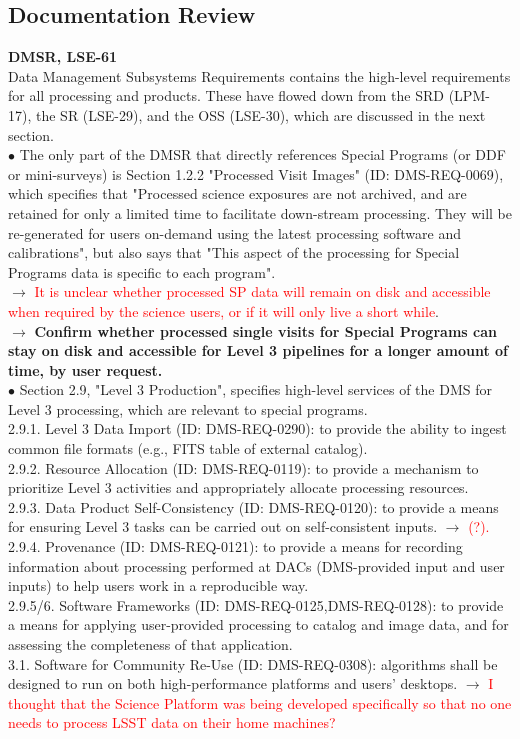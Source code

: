 \documentclass[DM,lsstdraft,toc]{lsstdoc}
\begin{document}
\subsection{Documentation Review}\label{ssec:dmdocs_review}

\noindent \textbf{DMSR, LSE-61} \\
Data Management Subsystems Requirements \citep{LSE-61} contains the high-level requirements for all processing and products. These have flowed down from the SRD (LPM-17), the SR (LSE-29), and the OSS (LSE-30), which are discussed in the next section. \\
$\bullet$ The only part of the DMSR that directly references Special Programs (or DDF or mini-surveys) is Section 1.2.2 "Processed Visit Images" (ID: DMS-REQ-0069), which specifies that "Processed science exposures are not archived, and are retained for only a limited time to facilitate down-stream processing. They will be re-generated for users on-demand using the latest processing software and calibrations", but also says that "This aspect of the processing for Special Programs data is specific to each program". \\
$\rightarrow$ \textcolor{red}{It is unclear whether processed SP data will remain on disk and accessible when required by the science users, or if it will only live a short while}. \\
$\rightarrow$ \textbf{Confirm whether processed single visits for Special Programs can stay on disk and accessible for Level 3 pipelines for a longer amount of time, by user request.} \\
$\bullet$ Section 2.9, "Level 3 Production", specifies high-level services of the DMS for Level 3 processing, which are relevant to special programs. \\
2.9.1. Level 3 Data Import (ID: DMS-REQ-0290): to provide the ability to ingest common file formats (e.g., FITS table of external catalog). \\
2.9.2. Resource Allocation (ID: DMS-REQ-0119): to provide a mechanism to prioritize Level 3 activities and appropriately allocate processing resources. \\
2.9.3. Data Product Self-Consistency (ID: DMS-REQ-0120): to provide a means for ensuring Level 3 tasks can be carried out on self-consistent inputs. $\rightarrow$ \textcolor{red}{(?).} \\
2.9.4. Provenance (ID: DMS-REQ-0121): to provide a means for recording information about processing performed at DACs (DMS-provided input and user inputs) to help users work in a reproducible way. \\
2.9.5/6. Software Frameworks (ID: DMS-REQ-0125,DMS-REQ-0128): to provide a means for applying user-provided processing to catalog and image data, and for assessing the completeness of that application. \\
3.1. Software for Community Re-Use (ID: DMS-REQ-0308): algorithms shall be designed to run on both high-performance platforms and users' desktops. $\rightarrow$ \textcolor{red}{I thought that the Science Platform was being developed specifically so that no one needs to process LSST data on their home machines?} \\
\end{document}
